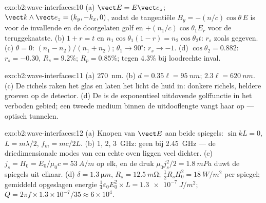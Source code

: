 \begin{solution}{exo:b2:wave-interfaces:10}
(a) $\vect E = E\vect e_z$; $\vect k\wedge\vect e_z = (k_y, -k_x, 0)$, zodat
de tangentiële $B_y = -(n/c)\cos\theta\,E$ is voor de invallende en de
doorgelaten golf en $+(n_1/c)\cos\theta_1E_r$ voor de teruggekaatste. (b)
$1 + r = t$ en $n_1\cos\theta_1
(1 - r) = n_2\cos\theta_2t$: $r_s$ zoals
gegeven. (c) $\theta = 0$: $(n_1 - n_2)/(n_1 +
n_2)$;
$\theta_1 \to 90^\circ$: $r_s \to -1$. (d) $\cos\theta_2 = 0.882$:
$r_s = -0.30$, $R_s =
9.2\%$; $R_p = 0.85\%$; tegen $4.3\%$ bij loodrechte
inval.
\end{solution}

\begin{solution}{exo:b2:wave-interfaces:11}
(a) \qty{270}{nm}. (b) $d = 0.35\ell = \qty{95}{nm}$;
$2.3\ell = \qty{620}{nm}$. (c) De richels raken het glas en laten het licht
de huid in: donkere richels, heldere groeven op de detector. (d) De
 is de exponentieel uitdovende golffunctie in het verboden
gebied; een tweede medium binnen de uitdooflengte vangt haar op --- optisch
tunnelen.
\end{solution}

\begin{solution}{exo:b2:wave-interfaces:12}
(a) Knopen van $\vect E$ aan beide spiegels: $\sin kL = 0$,
$L = m\lambda/2$, $f_m = mc/2L$. (b) $1$, $2$, \qty{3}{GHz}: geen bij
\qty{2.45}{GHz} --- de driedimensionale modes van een echte oven liggen veel
dichter. (c) $j_s = H_0 = E_0/\mu_0c = \qty{53}{A/m}$ op elk, en de druk
$\mu_0j_s^2/2 = \qty{1.8}{mPa}$ duwt de spiegels uit elkaar. (d)
$\delta = \qty{1.3}{\micro m}$, $R_s = \qty{12.5}{m\ohm}$;
$\tfrac12R_sH_0^2 =
\qty{18}{W/m^2}$ per spiegel; gemiddeld opgeslagen
energie $\tfrac14\varepsilon_0E_0^2 \times L = \qty{1.3e-7}{J/m^2}$;
$Q = 2\pi f \times 1.3 \times 10^{-7}/35 \approx 6 \times 10^4$.
\end{solution}

